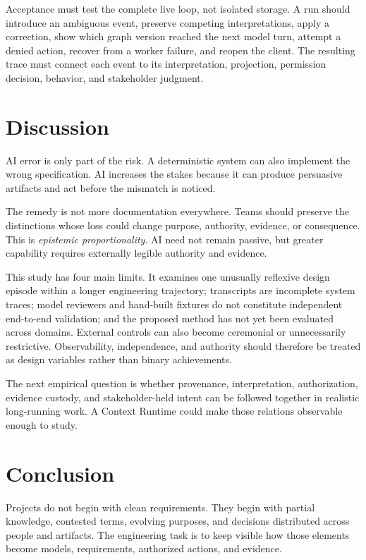 \documentclass[10pt,a4paper]{article}
\begin{document}
Acceptance must test the complete live loop, not isolated storage. A run should introduce an ambiguous event, preserve competing interpretations, apply a correction, show which graph version reached the next model turn, attempt a denied action, recover from a worker failure, and reopen the client. The resulting trace must connect each event to its interpretation, projection, permission decision, behavior, and stakeholder judgment.

\section{Discussion}

AI error is only part of the risk. A deterministic system can also implement the wrong specification. AI increases the stakes because it can produce persuasive artifacts and act before the mismatch is noticed.

The remedy is not more documentation everywhere. Teams should preserve the distinctions whose loss could change purpose, authority, evidence, or consequence. This is \emph{epistemic proportionality}. AI need not remain passive, but greater capability requires externally legible authority and evidence.

This study has four main limits. It examines one unusually reflexive design episode within a longer engineering trajectory; transcripts are incomplete system traces; model reviewers and hand-built fixtures do not constitute independent end-to-end validation; and the proposed method has not yet been evaluated across domains. External controls can also become ceremonial or unnecessarily restrictive. Observability, independence, and authority should therefore be treated as design variables rather than binary achievements.

The next empirical question is whether provenance, interpretation, authorization, evidence custody, and stakeholder-held intent can be followed together in realistic long-running work. A Context Runtime could make those relations observable enough to study.

\section{Conclusion}

Projects do not begin with clean requirements. They begin with partial knowledge, contested terms, evolving purposes, and decisions distributed across people and artifacts. The engineering task is to keep visible how those elements become models, requirements, authorized actions, and evidence.
\end{document}
